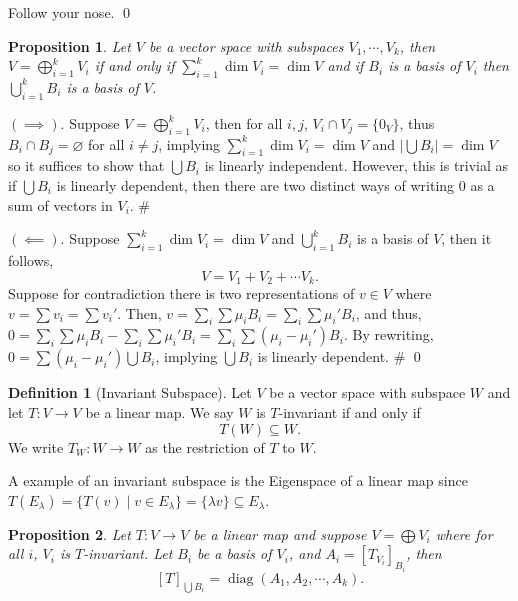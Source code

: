 \documentclass[
]{article}
\newtheorem{prop}{Proposition}[section]
\theoremstyle{definition}
\newtheorem{definition}{Definition}[section]
\begin{document}
Follow your nose. \qed

\begin{prop}
  Let \(V\) be a vector space with subspaces \(V_1, \cdots, V_k\), then 
  \(V = \bigoplus_{i = 1}^k V_i\) if and only if 
  \(\sum_{i = 1}^k \dim V_i = \dim V\) and if \(B_i\) is a basis of \(V_i\) then 
  \(\bigcup_{i = 1}^k B_i\) is a basis of \(V\).
\end{prop}
\proof

\((\implies)\). Suppose \(V = \bigoplus_{i = 1}^k V_i\), then for all
\(i, j\), \(V_i \cap V_j = \{0_V\}\), thus
\(B_i \cap B_j = \varnothing\) for all \(i \neq j\), implying
\(\sum_{i = 1}^k \dim V_i = \dim V\) and
\(\left| \bigcup B_i \right| = \dim V\) so it suffices to show that
\(\bigcup B_i\) is linearly independent. However, this is trivial as if
\(\bigcup B_i\) is linearly dependent, then there are two distinct ways
of writing 0 as a sum of vectors in \(V_i\). \#

\((\impliedby)\). Suppose \(\sum_{i = 1}^k \dim V_i = \dim V\) and
\(\bigcup_{i = 1}^k B_i\) is a basis of \(V\), then it follows,
\[V = V_1 + V_2 + \cdots V_k.\] Suppose for contradiction there is two
representations of \(v \in V\) where \(v = \sum v_i = \sum v_i'\). Then,
\(v = \sum_i \sum \mu_i B_i =  \sum_i \sum \mu_i' B_i\), and thus,
\(0 = \sum_i \sum \mu_i B_i -  \sum_i \sum \mu_i' B_i = \sum_i \sum (\mu_i - \mu_i') B_i\).
By rewriting, \(0 = \sum (\mu_i - \mu_i') \bigcup B_i\), implying
\(\bigcup B_i\) is linearly dependent. \# \qed

\begin{definition}[Invariant Subspace]
  Let \(V\) be a vector space with subspace \(W\) and let \(T : V \to V\) be 
  a linear map. We say \(W\) is \(T\)-invariant if and only if 
  \[T(W) \subseteq W.\]
  We write \(T_W : W \to W\) as the restriction of \(T\) to \(W\).
\end{definition}

A example of an invariant subspace is the Eigenspace of a linear map
since
\(T(E_\lambda) = \{ T(v) \mid v \in E_\lambda \} = \{\lambda v \} \subseteq E_\lambda\).

\begin{prop}
  Let \(T : V \to V\) be a linear map and suppose \(V = \bigoplus V_i\) where 
  for all \(i\), \(V_i\) is \(T\)-invariant. Let \(B_i\) be a basis of \(V_i\),
  and \(A_i = [T_{V_i}]_{B_i}\), then 
  \[[T]_{\bigcup B_i} = \mathop{\mathrm{diag}}(A_1, A_2, \cdots, A_k).\] 
\end{prop}
\proof
\end{document}
